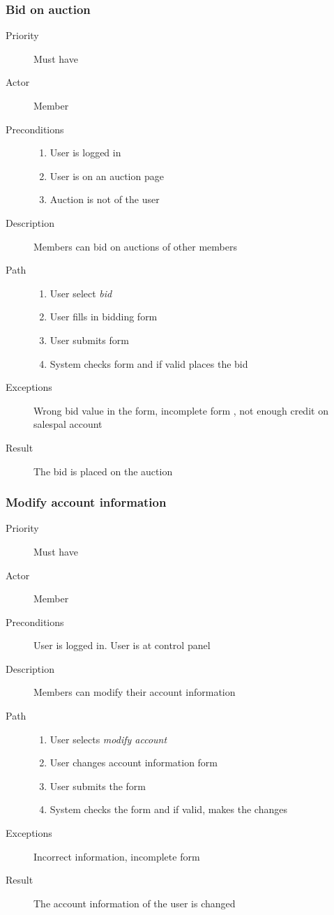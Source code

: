 \documentclass[a4paper, 12pt]{report}
\begin{document}
		\subsubsection{Bid on auction}
			\begin{description}
				\item[Priority] Must have
				\item[Actor] Member
				\item[Preconditions] 
 					\begin{enumerate}
						\item User is logged in
						\item User is on an auction page
						\item Auction is not of the user
					\end{enumerate}
				\item[Description] Members can bid on auctions of other members
				\item[Path]
 					\begin{enumerate}
						\item User select \emph{bid}
						\item User fills in bidding form
						\item User submits form
						\item System checks form and if valid places the bid
					\end{enumerate}
				\item[Exceptions] Wrong bid value in the form, incomplete form
				, not enough credit on salespal account
				\item[Result] The bid is placed on the auction
			\end{description}
		\subsubsection{Modify account information}
			\begin{description}
				\item[Priority] Must have
				\item[Actor] Member
				\item[Preconditions] User is logged in. User is at control panel
				\item[Description] Members can modify their account information
				\item[Path]
 					\begin{enumerate}
						\item User selects \emph{modify account}
						\item User changes account information form
						\item User submits the form
						\item System checks the form and if valid, makes the changes
					\end{enumerate}
				\item[Exceptions] Incorrect information, incomplete form
				\item[Result] The account information of the user is changed
			\end{description}
\end{document}
